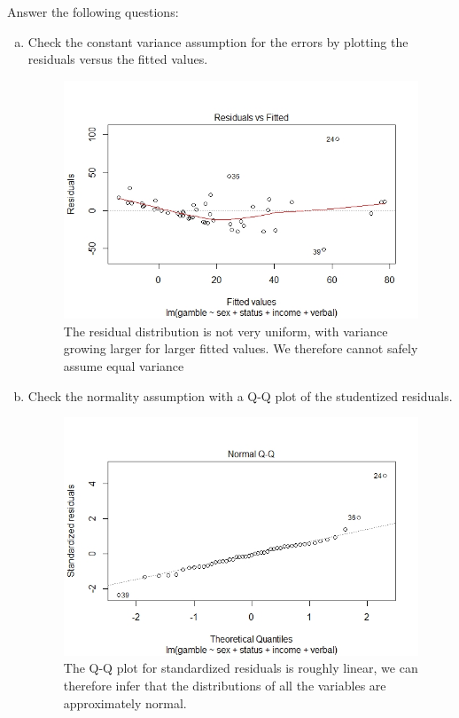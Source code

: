 \documentclass[12pt,letterpaper]{article}
\begin{document}
\vspace{.5cm}
  
\vspace{.5cm}
Answer the following questions:
\vspace{.5cm}
\begin{enumerate}[(a)]
	 \item Check the constant variance assumption for the errors by plotting the residuals versus the fitted values. 
	 
	 
  
	\begin{figure}[h!]\centering
	 	\label{top}
	 	\includegraphics[width=.75\textwidth]{Regressionplot1.JPEG}
	 	\caption{The residual distribution is not very uniform, with variance growing larger for larger fitted values. We therefore cannot safely assume equal variance}
 	\end{figure}
\newpage 
	\item Check the normality assumption with a Q-Q plot of the studentized residuals.	
	
	\begin{figure}[h!]\centering
		\label{bottom}
		\includegraphics[width=.75\textwidth]{Regressionplot2.JPEG}
		\caption{The Q-Q plot for standardized residuals is roughly linear, we can therefore infer that the distributions of all the variables are approximately normal.}
	\end{figure}
	

\end{enumerate}
\end{document}
